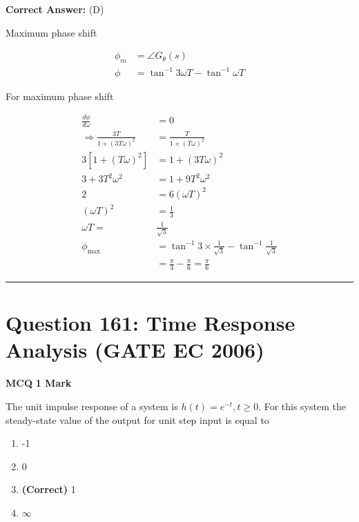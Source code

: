 \documentclass[11pt,a4paper]{article}
\begin{document}
\noindent \textbf{Correct Answer:} (D)

\begin{tcolorbox}[solbox, title=Detailed Solution -- Question 160]
Maximum phase shift

\[
\begin{aligned} \phi_{m} &=\angle G_{\theta}(s) \\ \phi &=\tan ^{-1} 3 \omega T-\tan ^{-1} \omega T \end{aligned}
\]

 For maximum phase shift

\[
\begin{aligned} \frac{d \phi}{d \omega} &=0 \\ \Rightarrow \frac{3 T}{1+(3 T \omega)^{2}} &=\frac{T}{1+(T \omega)^{2}} \\ 3\left[1+(T \omega)^{2}\right] &=1+(3 T \omega)^{2} \\ 3+3 T^{2} \omega^{2} &=1+9 T^{2} \omega^{2} \\ 2 &=6(\omega T)^{2} \\ (\omega T)^{2} &=\frac{1}{3} \\ \omega T=& \frac{1}{\sqrt{3}} \\\phi_{\max } &=\tan ^{-1} 3 \times \frac{1}{\sqrt{3}}-\tan ^{-1} \frac{1}{\sqrt{3}} \\
&=\frac{\pi}{3}-\frac{\pi}{6}=\frac{\pi}{6}\end{aligned}
\]
\end{tcolorbox}

\vspace{1.5em}
\hrule
\vspace{1.5em}

\section*{Question 161: Time Response Analysis (GATE EC 2006)}
\noindent \textbf{\color{primary}MCQ} \hfill \textbf{\color{secondary}1 Mark}


\noindent The unit impulse response of a system is $h(t) =  e^{-t},t\geq 0$. For this system the steady-state value of the output for unit step input is equal to


\begin{enumerate}[label=(\Alph*)]
    \item -1
    \item 0
    \item \textbf{(Correct)} 1
    \item $\infty$
\end{enumerate}
\end{document}
